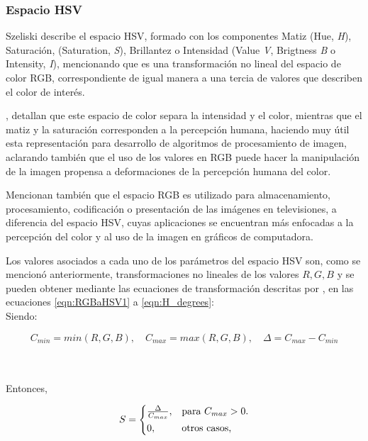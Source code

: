 \subsubsection{Espacio HSV}
Szeliski describe el espacio HSV, formado con los componentes Matiz (Hue, \textit{H}), Saturación, (Saturation, \textit{S}), Brillantez o Intensidad (Value \textit{V}, Brigtness \textit{B} o Intensity, \textit{I}), mencionando que es una transformación no lineal del espacio de color RGB, correspondiente de igual manera a una tercia de valores que describen el color de interés.

\cite{czerwinski_definitions_2013}, detallan que este espacio de color separa la intensidad y el color, mientras que el matiz y la saturación corresponden a la percepción humana, haciendo muy útil esta representación para desarrollo de algoritmos de procesamiento de imagen, aclarando también que el uso de los valores en RGB puede hacer la manipulación de la imagen propensa a deformaciones de la percepción humana del color. 

Mencionan también que el espacio RGB es utilizado para almacenamiento, procesamiento, codificación o presentación de las imágenes en televisiones, a diferencia del espacio HSV, cuyas aplicaciones se encuentran más enfocadas a la percepción del color y al uso de la imagen en gráficos de computadora.

Los valores asociados a cada uno de los parámetros del espacio HSV son, como se mencionó anteriormente, transformaciones no lineales de los valores  $R,G,B$ y se pueden obtener mediante las ecuaciones de transformación descritas por \cite{burger_digital_2022}, en las ecuaciones \ref{eqn:RGBaHSV1} a \ref{eqn:H_degrees}:\\

Siendo:

\begin{equation}
C_{min} = min(R,G,B), \quad
C_{max} = max(R,G,B), \quad
\Delta = C_{max} - C_{min}
\label{eqn:RGBaHSV1}
\end{equation}

\phantom{holis}\\
\phantom{holis}\\
Entonces,

\begin{equation}
    S = \begin{cases*}
  \frac{\Delta}{C_{max}}, & para $C_{max} > 0$.\\
  0, & otros casos,
    \end{cases*}
    \label{eqn:Saturation}
\end{equation}

